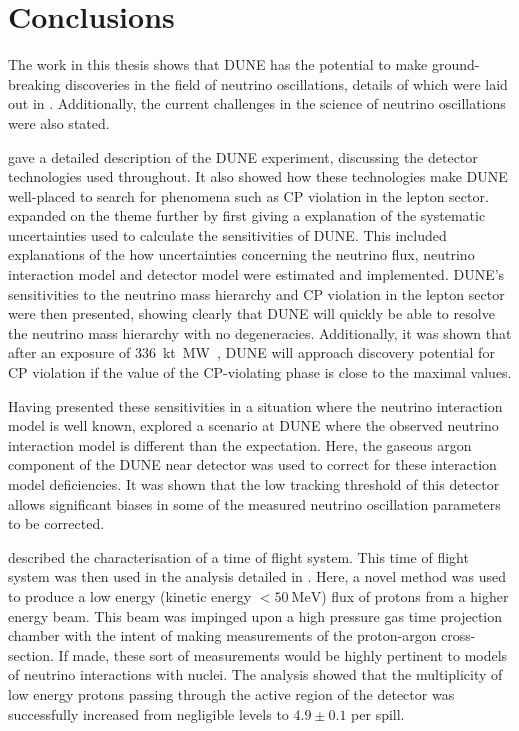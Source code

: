 \chapter{Conclusions}
\label{sec:conclusions}

The work in this thesis shows that DUNE has the potential to make ground-breaking discoveries in the field of neutrino oscillations, details of which were laid out in . 
Additionally, the current challenges in the science of neutrino oscillations were also stated.

 gave a detailed description of the DUNE experiment, discussing the detector technologies used throughout.
It also showed how these technologies make DUNE well-placed to search for phenomena such as CP violation in the lepton sector.
 expanded on the theme further by first giving a explanation of the systematic uncertainties used to calculate the sensitivities of DUNE. 
This included explanations of the how uncertainties concerning the neutrino flux, neutrino interaction model and detector model were estimated and implemented.
DUNE's sensitivities to the neutrino mass hierarchy and CP violation in the lepton sector were then presented, showing clearly that DUNE will quickly be able to resolve the neutrino mass hierarchy with no degeneracies.
Additionally, it was shown that after an exposure of \SI{336}{\kilo\tonne\mega\watt\year}, DUNE will approach discovery potential for CP violation if the value of the CP-violating phase is close to the maximal values.

Having presented these sensitivities in a situation where the neutrino interaction model is well known,  explored a scenario at DUNE where the observed neutrino interaction model is different than the expectation.
Here, the gaseous argon component of the DUNE near detector was used to correct for these interaction model deficiencies. 
It was shown that the low tracking threshold of this detector allows significant biases in some of the measured neutrino oscillation parameters to be corrected. 

 described the characterisation of a time of flight system.
This time of flight system was then used in the analysis detailed in .
Here, a novel method was used to produce a low energy (kinetic energy $<\SI{50}{\MeV}$) flux of protons from a higher energy beam.
This beam was impinged upon a high pressure gas time projection chamber with the intent of making measurements of the proton-argon cross-section.
If made, these sort of measurements would be highly pertinent to models of neutrino interactions with nuclei.
The analysis showed that the multiplicity of low energy protons passing through the active region of the detector was successfully increased from negligible levels to $4.9 \pm 0.1$ per spill.

